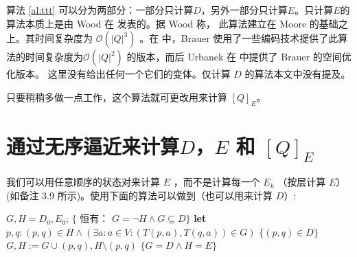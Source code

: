 算法 \ref{al:ttt} 可以分为两部分：一部分只计算$D$，另外一部分只计算$E$。只计算$E$的算法本质上是由 Wood 在 \cite[pg.132]{Wood87} 发表的。据 Wood 称， 此算法建立在 Moore \cite{Moor56} 的基础之上。其时间复杂度为 $\mathcal{O}(|Q|^3)$ 。在 \cite{Brau88} 中，Brauer 使用了一些编码技术提供了此算法的时间复杂度为$\mathcal{O}(|Q|^2)$ 的版本，而后 Urbanek 在 \cite{Urba89} 中提供了 Brauer 的空间优化版本。 这里没有给出任何一个它们的变体。仅计算 $D$ 的算法本文中没有提及。

只要稍稍多做一点工作，这个算法就可更改用来计算 $[Q]_E$。

\section{通过无序逼近来计算$D$，$E$ 和 $[Q]_E$}

我们可以用任意顺序的状态对来计算 $E$ ，而不是计算每一个 $E_k$ （按层计算 $E$）(如备注 3.9 所示)。使用下面的算法可以做到（也可以用来计算 $D$）:
\begin{algorithm}
    \caption{}\label{al:4-3}
    \begin{algorithmic}[1]
        \State $G,H=D_0,E_0$;
        \State $\{$ 恒有： $G= \neg H \land G \subseteq D \} $
            \State \textbf{let} $ p,q :(p,q) \in H \land ( \exists a : a \in V :  ( T(p,a) , T(q,a) ) \in G   ) $
            \State  $ \{  (p,q) \in D \}  $
            \State  $ G,H:= G \cup {(p,q)},H \setminus {(p,q) } $
        \Until $ \{ G=D \land H=E \}$
    \end{algorithmic}
\end{algorithm}

